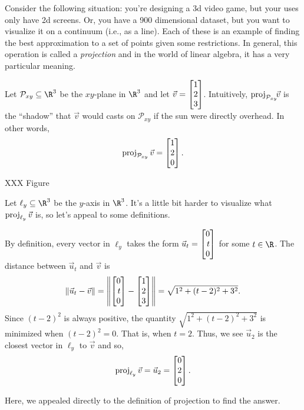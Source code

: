 Consider the following situation: you're designing a 3d video game, but your uses only have 2d screens.
Or, you have a 900 dimensional dataset, but you want to visualize it on a continuum (i.e., as a line). 
Each of these is an example
of finding the best approximation to a set of points given some restrictions. In general, this operation
is called a \emph{projection} and in the world of linear algebra, it has a very particular meaning.


Let $\mathcal P_{xy}\subseteq\R^3$ be the $xy$-plane in $\R^3$ and let $\vec v=\mat{1\\2\\3}$. Intuitively, 
$\operatorname{proj}_{\mathcal P_{xy}}\!\!\vec v$ is the ``shadow'' that  $\vec v$ would casts on ${\mathcal P_{xy}}$ if 
the sun were directly overhead.
In other words,
\[
	\Proj_{\mathcal P_{xy}}\vec v=\mat{1\\2\\0}.
\]

XXX Figure

Let $\ell_y\subseteq \R^3$ be the $y$-axis in $\R^3$. It's a little bit harder to visualize what $\operatorname{proj}_{\ell_y}\vec v$
is, so let's appeal to some definitions.

By definition, every vector in $\ell_y$ takes the form $\vec u_t=\mat{0\\t\\0}$ for some $t\in \R$. The distance
between $\vec u_t$ and $\vec v$ is
\[
	\Norm{\vec u_t-\vec v}=\norm*{\mat{0\\t\\0}-\mat{1\\2\\3}} = \sqrt{1^2+(t-2)^2+3^2}.
\]
Since $(t-2)^2$ is always positive, the quantity $\sqrt{1^2+(t-2)^2+3^2}$ is minimized when $(t-2)^2=0$. That is,
when $t=2$. Thus, we see $\vec u_2$ is the closest vector in $\ell_y$ to $\vec v$ and so,
\[
	\Proj_{\ell_y}\vec v=\vec u_2=\mat{0\\2\\0}.
\]

Here, we appealed directly to the definition of projection to find the answer.

